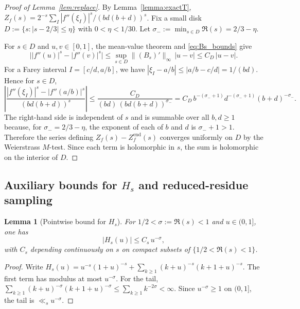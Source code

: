 \documentclass[a4paper,american,11pt]{amsart}
\theoremstyle{plain}
\newtheorem{lemma}[theorem]{Lemma}
\theoremstyle{definition}
\begin{document}
\begin{proof}[Proof of Lemma~\ref{lem:replace}]\label{proof:lem:replace}
By Lemma~\ref{lemma:exactT},
\(Z_f(s)=2^{-s}\sum_I |f''(\xi_I)|^s/(bd(b+d))^s\).
Fix a small disk $D:=\{s:|s-2/3|\le \eta\}$ with $0<\eta<1/30$.
Let $\sigma_-:=\min_{s\in D}\Re(s)=2/3-\eta$.

For \(s\in D\) and \(u,v\in[0,1]\), the mean-value theorem and \eqref{eq:Bs_bounds} give
\[
\bigl||f''(u)|^s-|f''(v)|^s\bigr|\le \sup_{s\in D}\|(B_s)'\|_{\infty}\,|u-v|\le C_D\,|u-v|.
\]
For a Farey interval $I=[c/d,a/b]$, we have $|\xi_I-a/b|\le|a/b-c/d|=1/(bd)$.
Hence for $s\in D$,
\[\!\!\!
\left|\frac{|f''(\xi_I)|^s-|f''(a/b)|^s}{(bd(b+d))^s}\right|
\le
\frac{C_D}{(bd)\,(bd(b+d))^{\sigma_-}}
=
C_D\, b^{-(\sigma_-+1)}d^{-(\sigma_-+1)}(b+d)^{-\sigma_-}.
\]
The right-hand side is independent of $s$ and is summable over all $b,d\ge1$ because, for \(\sigma_-=2/3-\eta\), the exponent of each of \(b\) and \(d\) is \(\sigma_-+1>1\).
Therefore the series defining $Z_f(s)-Z_f^{\mathrm{end}}(s)$ converges uniformly on $D$ by the Weierstrass $M$-test. Since each term is holomorphic in $s$, the sum is holomorphic on the interior of $D$.
\end{proof}


\subsection{Auxiliary bounds for $H_s$ and reduced-residue sampling}

\begin{lemma}[\texorpdfstring{Pointwise bound for \(H_s\)}{Pointwise bound for Hs}]
\label{lem:Hsbound}
For \(1/2<\sigma:=\Re(s)<1\) and \(u\in(0,1]\), one has
\[
|H_s(u)|\le C_{s}\,u^{-\sigma},
\]
with $C_s$ depending continuously on $s$ on compact subsets of $\{1/2<\Re(s)<1\}$.
\end{lemma}

\begin{proof}
Write
\(H_s(u)=u^{-s}(1+u)^{-s}+\sum_{k\ge1}(k+u)^{-s}(k+1+u)^{-s}\).
The first term has modulus at most $u^{-\sigma}$. For the tail,
\(\sum_{k\ge1}(k+u)^{-\sigma}(k+1+u)^{-\sigma}\le \sum_{k\ge1}k^{-2\sigma}<\infty\).
Since $u^{-\sigma}\ge1$ on $(0,1]$, the tail is $\ll_s u^{-\sigma}$.
\end{proof}
\end{document}
